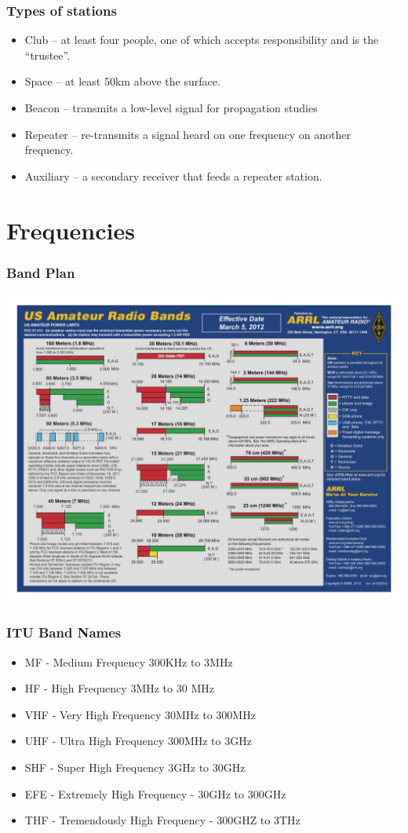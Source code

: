\documentclass[10pt]{beamer}
\begin{document}
\begin{frame}
\frametitle{Types of stations}
\begin{itemize}
\item Club – at least four  people, one of which accepts responsibility and is the “trustee”.
\item Space – at least 50km above the surface.
\item Beacon --  transmits a low-level signal for propagation studies
\item Repeater – re-transmits  a signal heard on one frequency on another frequency.
\item Auxiliary – a secondary receiver that feeds a repeater station.  
\end{itemize}
\end{frame}

\section{Frequencies}

\begin{frame}
\frametitle{Band Plan}
\begin{center}
\includegraphics[height=.9\textheight]{hambandscolor.pdf}
\end{center}
\end{frame}

\begin{frame}
\frametitle{ITU Band Names}
\begin{itemize}
\item MF - Medium Frequency 300KHz to 3MHz
\item HF - High Frequency 3MHz to 30 MHz
\item VHF - Very High Frequency 30MHz to 300MHz
\item UHF - Ultra High Frequency 300MHz to 3GHz
\item SHF - Super High Frequency 3GHz to 30GHz
\item EFE - Extremely High Frequency - 30GHz to 300GHz
\item THF - Tremendously High Frequency - 300GHZ to 3THz
\end{itemize}
\end{frame}
\end{document}
